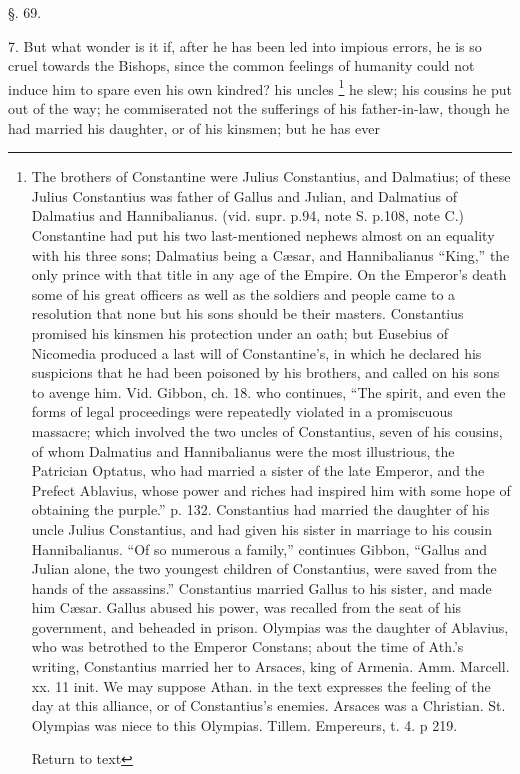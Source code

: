 §. 69.

7. But what wonder is it if, after he has been
led into impious errors, he is so cruel towards the Bishops, since the
common feelings of humanity could not induce him to spare even his own
kindred? his uncles \footnote{The brothers of Constantine were Julius
Constantius, and Dalmatius; of these Julius Constantius was father of
Gallus and Julian, and Dalmatius of Dalmatius and Hannibalianus. (vid.
supr. p.94, note S. p.108, note C.) Constantine had put his two
last-mentioned nephews almost on an equality with his three sons;
Dalmatius being a Cæsar, and Hannibalianus ``King,'' the only prince
with that title in any age of the Empire. On the Emperor's death some
of his great officers as well as the soldiers and people came to a
resolution that none but his sons should be their masters. Constantius
promised his kinsmen his protection under an oath; but Eusebius of
Nicomedia produced a last will of Constantine's, in which he declared
his suspicions that he had been poisoned by his brothers, and called
on his sons to avenge him. Vid. Gibbon, ch. 18. who continues, ``The
spirit, and even the forms of legal proceedings were repeatedly
violated in a promiscuous massacre; which involved the two uncles of
Constantius, seven of his cousins, of whom Dalmatius and Hannibalianus
were the most illustrious, the Patrician Optatus, who had married a
sister of the late Emperor, and the Prefect Ablavius, whose power and
riches had inspired him with some hope of obtaining the purple.'' p.
132. Constantius had married the daughter of his uncle Julius
Constantius, and had given his sister in marriage to his cousin
Hannibalianus. ``Of so numerous a family,'' continues Gibbon, ``Gallus
and Julian alone, the two youngest children of Constantius, were saved
from the hands of the assassins.'' Constantius married Gallus to his
sister, and made him Cæsar. Gallus abused his power, was recalled
from the seat of his government, and beheaded in prison. Olympias was
the daughter of Ablavius, who was betrothed to the Emperor Constans;
about the time of Ath.'s writing, Constantius married her to Arsaces,
king of Armenia. Amm. Marcell. xx. 11 init. We may suppose Athan. in
the text expresses the feeling of the day at this alliance, or of
Constantius's enemies. Arsaces was a Christian. St. Olympias was niece
to this Olympias. Tillem. Empereurs, t. 4. p 219.

Return to text} he slew; his cousins he put out of
the way; he commiserated not the sufferings of his father-in-law,
though he had married his daughter, or of his kinsmen; but he has ever
